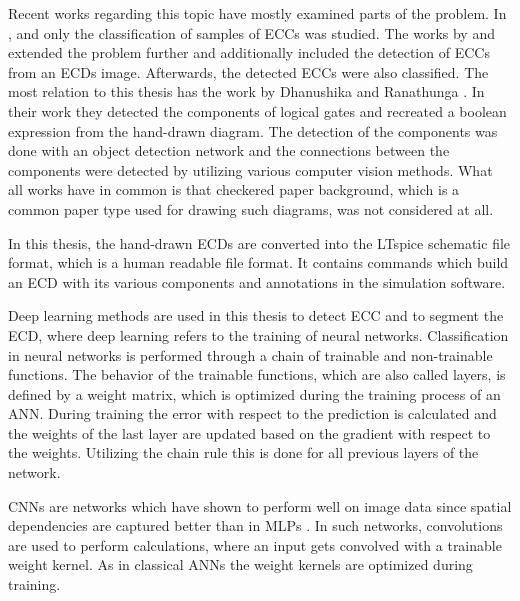 Recent works regarding this topic have mostly examined parts of the problem.
In \cite{ecd_basecnn}, \cite{ecd_anngeo} and \cite{ecd_texturesmo} only the classification of samples of \acp{ECC} was studied.
The works by \cite{ecd_knn_recog} and \cite{ecd_seghogsvm} extended the problem further and additionally included the detection of \acp{ECC} from an \acp{ECD} image.
Afterwards, the detected \acp{ECC} were also classified.
The most relation to this thesis has the work by Dhanushika and Ranathunga \cite{ecd_yolobool}.
In their work they detected the components of logical gates and recreated a boolean expression from the hand-drawn diagram.
The detection of the components was done with an object detection network and the connections between the components were detected by utilizing various computer vision methods.
What all works have in common is that checkered paper background, which is a common paper type used for drawing such diagrams, was not considered at all.

In this thesis, the hand-drawn \acp{ECD} are converted into the LTspice schematic file format, which is a human readable file format.
It contains commands which build an \ac{ECD} with its various components and annotations in the simulation software.

Deep learning methods are used in this thesis to detect \ac{ECC} and to segment the \ac{ECD}, where deep learning refers to the training of neural networks.
Classification in neural networks is performed through a chain of trainable and non-trainable functions.
The behavior of the trainable functions, which are also called layers, is defined by a weight matrix, which is optimized during the training process of an \ac{ANN}.
During training the error with respect to the prediction is calculated and the weights of the last layer are updated based on the gradient with respect to the weights.
Utilizing the chain rule this is done for all previous layers of the network.

\acp{CNN} are networks which have shown to perform well on image data since spatial dependencies are captured better than in \acp{MLP} \cite{lecun_lenet}.
In such networks, convolutions are used to perform calculations, where an input gets convolved with a trainable weight kernel.
As in classical \acp{ANN} the weight kernels are optimized during training.


